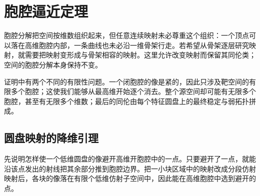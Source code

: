 
% 
% 
% 

\section{胞腔逼近定理}
\label{g2:sec:0104}

胞腔分解把空间按维数组织起来，但任意连续映射未必尊重这个组织：一个顶点可以落在高维胞腔内部，一条曲线也未必沿一维骨架行走。若希望从骨架逐层研究映射，就需要把映射变形成与骨架相容的映射。这里允许改变映射而保留其同伦类；空间的胞腔分解本身保持不变。

\ProseParagraphBreak

证明中有两个不同的有限性问题。一个闭胞腔的像是紧的，因此只涉及靶空间的有限多个胞腔；这使我们能够从最高维开始逐个消去。整个源空间却可能有无限多个胞腔，甚至有无限多个维数；最后的同伦由每个特征圆盘上的最终稳定与弱拓扑拼成。

\subsection{圆盘映射的降维引理}
\label{g2:subsec:0104:01}

先说明怎样使一个低维圆盘的像避开高维开胞腔中的一点。只要避开了一点，就能沿该点发出的射线把其余部分推到胞腔边界。把一小块区域中的映射改成分段仿射映射后，各块的像落在有限个低维仿射子空间中，因此能在高维胞腔中选到避开的点。

